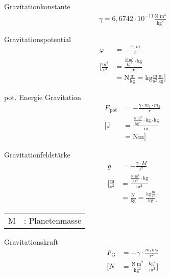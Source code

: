\begin{karte}{Gravitationkonstante}
    \begin{align*}
        \gamma = 6,6742 \cdot 10^{-11} \frac{\text{N m}^2}{\text{kg}^2}
    \end{align*}
\end{karte}

\begin{karte}{Gravitationspotential}
    \begin{align*}
        \varphi &= - \frac{\gamma \cdot m }{r} \\
        \bigg[ \frac{\text{m}^2}{\text{s}^2} &= \frac{\frac{\text{N m}^2}{\text{kg}^2} \cdot \text{kg}}{\text{m}} \\
            &= \text{N}\frac{\text{m}}{\text{kg}} = \text{kg}\frac{\text{m}}{\text{s}^2}\frac{\text{m}}{\text{kg}} 
            \bigg]
    \end{align*}
\end{karte}

\begin{karte}{pot. Energie Gravitation}
    \begin{align*}
        E_\text{pot} &= - \frac{\gamma \cdot m_1 \cdot m_2}{r}\\
        \bigg[ \text{J} &= \frac{\frac{\text{N m}^2}{\text{kg}^2} \cdot \text{kg} \cdot \text{kg}}{\text{m}} \\
            &= \text{Nm} \bigg]
    \end{align*}
\end{karte}

\begin{karte}{Gravitationfeldstärke}
    \begin{align*}
        g &= - \frac{ \gamma \cdot M }{r^2} \\
        \bigg[ \frac{\text{m}}{\text{s}^2} &= \frac{\frac{\text{N m}^2}{\text{kg}^2} \cdot \text{kg}}{\text{m}^2} \\
            &= \frac{\text{N}}{\text{kg}} = \frac{\text{kg}\frac{\text{m}}{\text{s}^2}}{\text{kg}}
            \bigg]
    \end{align*}
    \begin{tabular}[t]{cl}
        M &: Planetenmasse
    \end{tabular}
\end{karte}

\begin{karte}{Gravitationskraft}
    \begin{align*}
        F_\text{G} &= - \gamma \cdot \frac{m_1m_2}{r^2} \\
        \bigg[ N &= \frac{\text{N m}^2}{\text{kg}^2} \cdot \frac{\text{kg}^2}{\text{m}^2} \bigg]
    \end{align*}
\end{karte}


